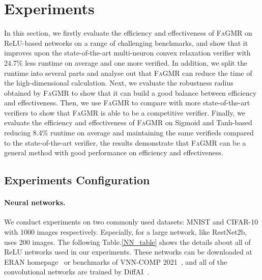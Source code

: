 \documentclass[runningheads]{llncs}
\newcommand{\ourtool}{\textsc{FaGMR}\xspace}
\newcommand{\prima}{\textsc{Prima}\xspace}
\newcommand{\mnist}{MNIST\xspace}
\newcommand{\cifar}{CIFAR-10\xspace}
\newcommand{\relu}{ReLU\xspace}
\begin{document}
%
%
%

\section{Experiments}
\label{sec:experiment}
In this section, 
we firstly evaluate the efficiency and effectiveness of \ourtool on \relu-based networks on a range of challenging benchmarks,
and show that it improves upon the state-of-the-art multi-neuron convex relaxation
verifier with 24.7\% less runtime on average and one more verified. In addition, we split the runtime into several parts and analyse out that \ourtool can reduce the time of the high-dimensional calculation. Next, we evaluate the robustness radius obtained by \ourtool to show that it can build a good balance between efficiency and effectiveness. Then, we use \ourtool to compare with more state-of-the-art verifiers to show that \ourtool is able to be a competitive verifier. Finally, we evaluate the efficiency and effectiveness of \ourtool on Sigmoid and Tanh-based reducing 8.4\% runtime on average and maintaining the same verifieds compared to the state-of-the-art verifier, the results demonstrate that \ourtool can be a general method with good performance on efficiency and effectiveness.


\subsection{Experiments Configuration}
\paragraph{Neural networks.}
We conduct experiments on two commonly used datasets: \mnist and \cifar with 1000 images respectively.
Especially, for a large network, like RestNet2b, uses 200 images.
The following Table.\ref{NN_table} shows the details about all of \relu networks used in our experiments.
These networks can be downloaded at ERAN homepage~\cite{ref_url4} or benchmarks of VNN-COMP 2021~\cite{DBLP:journals/corr/abs-2109-00498}, and all of the convolutional networks are trained by DiffAI~\cite{mirman2018differentiable}.
\end{document}
